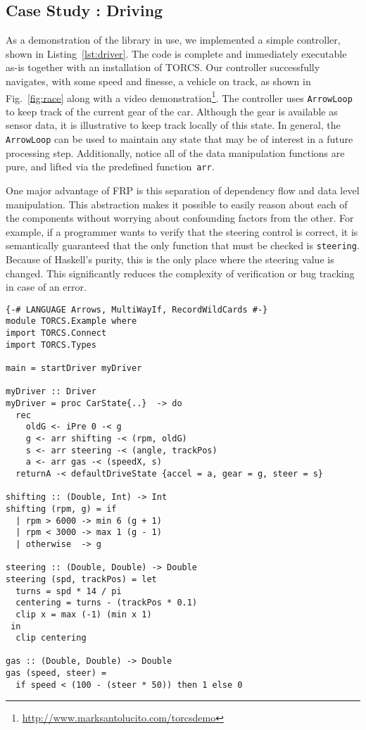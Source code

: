 \subsection{Case Study : Driving}

As a demonstration of the \ourLib library in use, we implemented a simple controller, shown in Listing~\ref{lst:driver}. 
The code is complete and immediately executable as-is together with an installation of TORCS.
Our controller successfully navigates, with some speed and finesse, a vehicle on track, as shown in Fig.~\ref{fig:race} along with a video demonstration\footnote{\url{http://www.marksantolucito.com/torcsdemo}}.
The controller uses \texttt{ArrowLoop} to keep track of the current gear of the car.
Although the gear is available as sensor data, it is illustrative to keep track locally of this state.
In general, the \texttt{ArrowLoop} can be used to maintain any state that may be of interest in a future processing step.
Additionally, notice all of the data manipulation functions are pure, and lifted via the predefined function~\texttt{arr}.

One major advantage of FRP is this separation of dependency flow and data level manipulation. 
This abstraction makes it possible to easily reason about each of the components without worrying about confounding factors from the other.
For example, if a programmer wants to verify that the steering control is correct, it is semantically guaranteed that the only function that must be checked is \texttt{steering}.
Because of Haskell's purity, this is the only place where the steering value is changed. This significantly reduces the complexity of verification or bug tracking in case of an error.

\begin{lstlisting}[float,floatplacement=TR,caption=A complete basic controller in Yampa, label=lst:driver]
{-# LANGUAGE Arrows, MultiWayIf, RecordWildCards #-}
module TORCS.Example where
import TORCS.Connect
import TORCS.Types

main = startDriver myDriver

myDriver :: Driver
myDriver = proc CarState{..}  -> do
  rec 
    oldG <- iPre 0 -< g
    g <- arr shifting -< (rpm, oldG)
    s <- arr steering -< (angle, trackPos)
    a <- arr gas -< (speedX, s)
  returnA -< defaultDriveState {accel = a, gear = g, steer = s}

shifting :: (Double, Int) -> Int
shifting (rpm, g) = if 
  | rpm > 6000 -> min 6 (g + 1)
  | rpm < 3000 -> max 1 (g - 1)
  | otherwise  -> g
 
steering :: (Double, Double) -> Double
steering (spd, trackPos) = let
  turns = spd * 14 / pi
  centering = turns - (trackPos * 0.1)
  clip x = max (-1) (min x 1)
 in
  clip centering

gas :: (Double, Double) -> Double
gas (speed, steer) = 
  if speed < (100 - (steer * 50)) then 1 else 0
\end{lstlisting}

